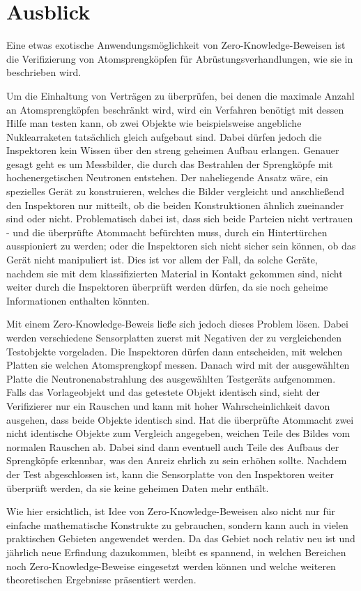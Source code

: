 \section{Ausblick}

Eine etwas exotische Anwendungsmöglichkeit von Zero-Knowledge-Beweisen ist die Verifizierung von Atomsprengköpfen für Abrüstungsverhandlungen, wie sie in \cite{nuclear} beschrieben wird.

Um die Einhaltung von Verträgen zu überprüfen, bei denen die maximale Anzahl an Atomsprengköpfen beschränkt wird, wird ein Verfahren benötigt mit dessen Hilfe man testen kann, ob zwei Objekte wie beispielsweise angebliche Nuklearraketen tatsächlich gleich aufgebaut sind. Dabei dürfen jedoch die Inspektoren kein Wissen über den streng geheimen Aufbau erlangen. Genauer gesagt geht es um Messbilder, die durch das Bestrahlen der Sprengköpfe mit hochenergetischen Neutronen entstehen. Der naheliegende Ansatz wäre, ein spezielles Gerät zu konstruieren, welches die Bilder vergleicht und anschließend den Inspektoren nur mitteilt, ob die beiden Konstruktionen ähnlich zueinander sind oder nicht. Problematisch dabei ist, dass sich beide Parteien nicht vertrauen - und die überprüfte Atommacht befürchten muss, durch ein Hintertürchen ausspioniert zu werden; oder die Inspektoren sich nicht sicher sein können, ob das Gerät nicht manipuliert ist. Dies ist vor allem der Fall, da solche Geräte, nachdem sie mit dem klassifizierten Material in Kontakt gekommen sind, nicht weiter durch die Inspektoren überprüft werden dürfen, da sie noch geheime Informationen enthalten könnten.

Mit einem Zero-Knowledge-Beweis ließe sich jedoch dieses Problem lösen. Dabei werden verschiedene Sensorplatten zuerst mit Negativen der zu vergleichenden Testobjekte vorgeladen. Die Inspektoren dürfen dann entscheiden, mit welchen Platten sie welchen Atomsprengkopf messen. Danach wird mit der ausgewählten Platte die Neutronenabstrahlung des ausgewählten Testgeräts aufgenommen. Falls das Vorlageobjekt und das getestete Objekt identisch sind, sieht der Verifizierer nur ein Rauschen und kann mit hoher Wahrscheinlichkeit davon ausgehen, dass beide Objekte identisch sind. Hat die überprüfte Atommacht zwei nicht identische Objekte zum Vergleich angegeben, weichen Teile des Bildes vom normalen Rauschen ab. Dabei sind dann eventuell auch Teile des Aufbaus der Sprengköpfe erkennbar, was den Anreiz ehrlich zu sein erhöhen sollte. Nachdem der Test abgeschlossen ist, kann die Sensorplatte von den Inspektoren weiter überprüft werden, da sie keine geheimen Daten mehr enthält.

Wie hier ersichtlich, ist Idee von Zero-Knowledge-Beweisen also nicht nur für einfache mathematische Konstrukte zu gebrauchen, sondern kann auch in vielen praktischen Gebieten angewendet werden. Da das Gebiet noch relativ neu ist und jährlich neue Erfindung dazukommen, bleibt es spannend, in welchen Bereichen noch Zero-Knowledge-Beweise eingesetzt werden können und welche weiteren theoretischen Ergebnisse präsentiert werden.

\pagebreak
